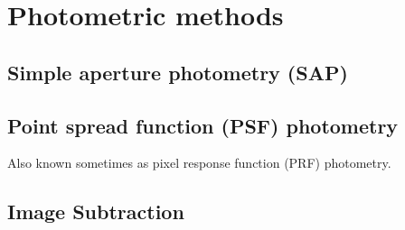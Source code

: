 



\section{Photometric methods}




\subsection{Simple aperture photometry (SAP)}

\subsection{Point spread function (PSF) photometry}
Also known sometimes as pixel response function (PRF) photometry.

\subsection{Image Subtraction}
